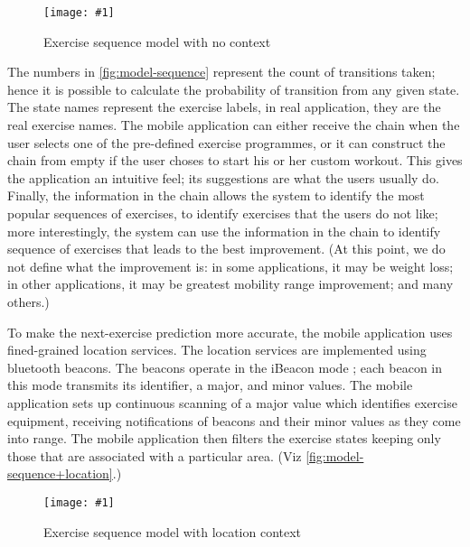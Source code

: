 \documentclass[a4paper, 10 pt, conference]{IEEEtran}
\newcommand{\fig}[3]{
  \begin{figure}[h]
    \begin{center}
        \caption{#3}
        \texttt{[image: \#1]}
        \label{fig:#2}
    \end{center}
  \end{figure}
}
\begin{document}
\fig{ri-model-sequence.png}{model-sequence}{Exercise sequence model with no context}

The numbers in \autoref{fig:model-sequence} represent the count of transitions taken; hence it is possible to calculate the probability of transition from any given state. The state names represent the exercise labels, in real application, they are the real exercise names. The mobile application can either receive the chain when the user selects one of the pre-defined exercise programmes, or it can construct the chain from empty if the user choses to start his or her custom workout. This gives the application an intuitive feel; its suggestions are what the users usually do. Finally, the information in the chain allows the system to identify the most popular sequences of exercises, to identify exercises that the users do not like; more interestingly, the system can use the information in the chain to identify sequence of exercises that leads to the best improvement. (At this point, we do not define what the improvement is: in some applications, it may be weight loss; in other applications, it may be greatest mobility range improvement; and many others.)

To make the next-exercise prediction more accurate, the mobile application uses fined-grained location services. The location services are implemented using bluetooth beacons. The beacons operate in the iBeacon mode \cite{ibeacon}; each beacon in this mode transmits its identifier, a major, and minor values. The mobile application sets up continuous scanning of a major value which identifies exercise equipment, receiving notifications of beacons and their minor values as they come into range. The mobile application then filters the exercise states keeping only those that are associated with a particular area. (Viz \autoref{fig:model-sequence+location}.)

\fig{ri-model-sequence+location.png}{model-sequence+location}{Exercise sequence model with location context}
\end{document}

